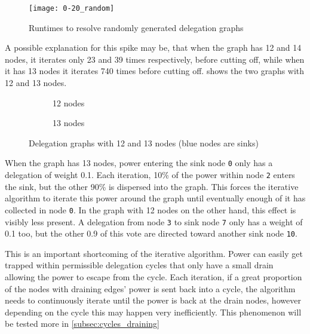 \begin{figure}[t]
    \centering
    \texttt{[image: 0-20\_random]}
    \caption{Runtimes to resolve randomly generated delegation graphs}
    \label{fig:random-tiny}
\end{figure}

A possible explanation for this spike may be, that when the graph has 12 and 14 nodes, it iterates only 23 and 39 times respectively, before cutting off, while when it has 13 nodes it iterates 740 times before cutting off.  shows the two graphs with 12 and 13 nodes.

\begin{figure}[t]
    \centering
    \begin{subfigure}[t]{0.45\textwidth}
        \centering
        \caption{12 nodes}
        \label{subfig:random-12and13-12}
    \end{subfigure}
    \hfill
    \begin{subfigure}[t]{0.45\textwidth}
        \centering
        \caption{13 nodes}
        \label{subfig:random-12and13-13}
    \end{subfigure}
    \caption{Delegation graphs with 12 and 13 nodes (blue nodes are sinks)}
    \label{fig:random-12and13}
\end{figure}

When the graph has 13 nodes, power entering the sink node \texttt{0} only has a delegation of weight 0.1. Each iteration, 10\% of the power within node \texttt{2} enters the sink, but the other 90\% is dispersed into the graph. This forces the iterative algorithm to iterate this power around the graph until eventually enough of it has collected in node \texttt{0}. In the graph with 12 nodes on the other hand, this effect is visibly less present. A delegation from node \texttt{3} to sink node \texttt{7} only has a weight of 0.1 too, but the other 0.9 of this vote are directed toward another sink node \texttt{10}. 

This is an important shortcoming of the iterative algorithm. Power can easily get trapped within permissible delegation cycles that only have a small drain allowing the power to escape from the cycle. Each iteration, if a great proportion of the nodes with draining edges' power is sent back into a cycle, the algorithm needs to continuously iterate until the power is back at the drain nodes, however depending on the cycle this may happen very inefficiently. This phenomenon will be tested more in \cref{subsec:cycles_draining}

